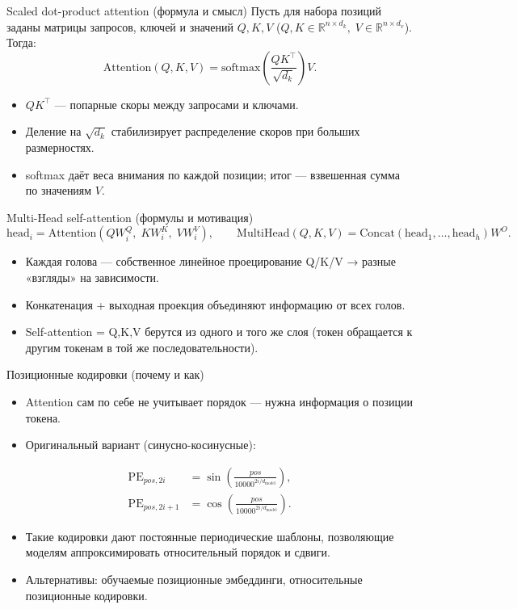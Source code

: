 \documentclass[aspectratio=1610,12pt]{beamer}
\begin{document}
\begin{frame}{Scaled dot-product attention (формула и смысл)}
\small
Пусть для набора позиций заданы матрицы запросов, ключей и значений $Q, K, V$ ($Q,K \in \mathbb{R}^{n\times d_k},\; V\in\mathbb{R}^{n\times d_v}$). Тогда:
\[
\mathrm{Attention}(Q,K,V)=\mathrm{softmax}\!\left(\frac{QK^\top}{\sqrt{d_k}}\right)V.
\]
\begin{itemize}
  \item $QK^\top$ — попарные скоры между запросами и ключами.
  \item Деление на $\sqrt{d_k}$ стабилизирует распределение скоров при больших размерностях.
  \item softmax даёт веса внимания по каждой позиции; итог — взвешенная сумма по значениям $V$.
\end{itemize}
\end{frame}

\begin{frame}{Multi-Head self-attention (формулы и мотивация)}
\small
\[
\text{head}_i = \mathrm{Attention}(QW_i^Q,\;KW_i^K,\;VW_i^V),\qquad
\mathrm{MultiHead}(Q,K,V) = \mathrm{Concat}(\text{head}_1,\dots,\text{head}_h)W^O.
\]
\begin{itemize}
  \item Каждая голова — собственное линейное проецирование Q/K/V → разные «взгляды» на зависимости.
  \item Конкатенация + выходная проекция объединяют информацию от всех голов.
  \item Self-attention = Q,K,V берутся из одного и того же слоя (токен обращается к другим токенам в той же последовательности).
\end{itemize}
\end{frame}

\begin{frame}{Позиционные кодировки (почему и как)}
\small
\begin{itemize}
  \item Attention сам по себе не учитывает порядок — нужна информация о позиции токена.
  \item Оригинальный вариант (синусно-косинусные):
\end{itemize}
\[
\begin{aligned}
\mathrm{PE}_{pos,2i} &= \sin\!\left(\frac{pos}{10000^{2i/d_\text{model}}}\right),\\
\mathrm{PE}_{pos,2i+1} &= \cos\!\left(\frac{pos}{10000^{2i/d_\text{model}}}\right).
\end{aligned}
\]
\begin{itemize}
  \item Такие кодировки дают постоянные периодические шаблоны, позволяющие моделям аппроксимировать относительный порядок и сдвиги.
  \item Альтернативы: обучаемые позиционные эмбеддинги, относительные позиционные кодировки.
\end{itemize}
\end{frame}
\end{document}
